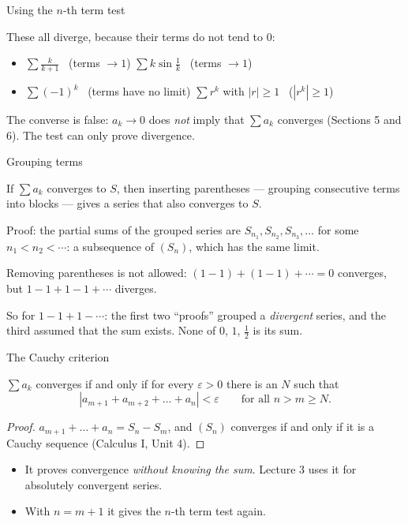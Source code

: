\documentclass[10pt]{wosm-slides}
\begin{document}
\begin{frame}{Using the $n$-th term test}
  \begin{example}
    These all diverge, because their terms do not tend to $0$:
    \begin{itemize}
      \item $\sum \frac{k}{k+1}$ \ (terms $\to 1$) \qquad
        $\sum k \sin\frac1k$ \ (terms $\to 1$)
      \item $\sum (-1)^k$ \ (terms have no limit) \qquad
        $\sum r^k$ with $|r| \ge 1$ \ ($|r^k| \ge 1$)
    \end{itemize}
  \end{example}
  \pause
  \begin{warning}
    The converse is false: $a_k \to 0$ does \emph{not} imply that $\sum a_k$ converges
    (Sections 5 and 6). The test can only prove divergence.
  \end{warning}
\end{frame}

\begin{frame}{Grouping terms}
  \begin{theorem}
    If $\sum a_k$ converges to $S$, then inserting parentheses --- grouping
    consecutive terms into blocks --- gives a series that also converges to $S$.
  \end{theorem}
  {\small Proof: the partial sums of the grouped series are
  $S_{n_1}, S_{n_2}, S_{n_3}, \dots$ for some $n_1 < n_2 < \cdots$: a subsequence of $(S_n)$,
  which has the same limit.\par}
  \pause
  \begin{warning}
    Removing parentheses is not allowed:
    $(1 - 1) + (1 - 1) + \cdots = 0$ converges, but $1 - 1 + 1 - 1 + \cdots$ diverges.
  \end{warning}
  \pause
  So for $1 - 1 + 1 - \cdots$: the first two ``proofs'' grouped a \emph{divergent}
  series, and the third assumed that the sum exists. None of $0$, $1$, $\frac12$ is its sum.
\end{frame}

\begin{frame}{The Cauchy criterion}
  \begin{theorem}
    $\sum a_k$ converges if and only if for every $\varepsilon > 0$ there is an $N$ such that
    \[ |a_{m+1} + a_{m+2} + \dots + a_n| < \varepsilon \qquad\text{for all } n > m \ge N . \]
  \end{theorem}
  \begin{proof}
    $a_{m+1} + \dots + a_n = S_n - S_m$, and $(S_n)$ converges if and only if it is a
    Cauchy sequence (Calculus I, Unit 4).
  \end{proof}
  \begin{itemize}
    \item It proves convergence \emph{without knowing the sum}. Lecture 3 uses it for
      absolutely convergent series.
    \item With $n = m + 1$ it gives the $n$-th term test again.
  \end{itemize}
\end{frame}
\end{document}
